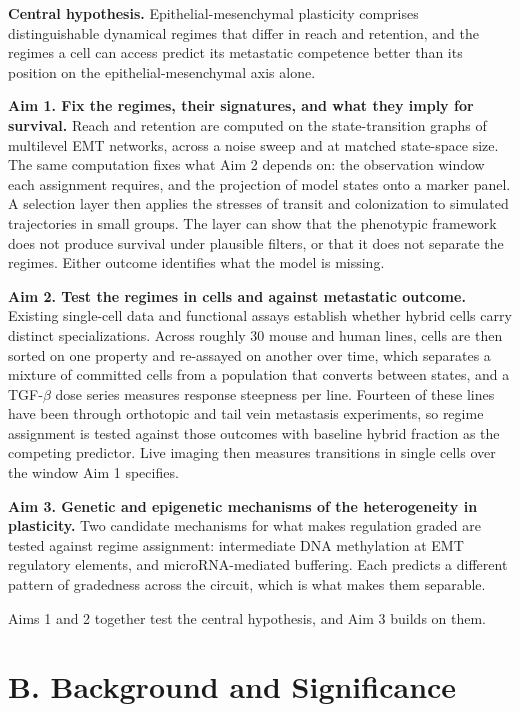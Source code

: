 \documentclass[12pt,letterpaper]{article}
\newcommand{\chg}[1]{\textcolor{chgcolor}{#1}}
\newcommand{\chg}[1]{#1}
\newcommand{\lead}[1]{\textbf{#1}}
\begin{document}
\lead{Central hypothesis.} Epithelial-mesenchymal plasticity comprises distinguishable dynamical regimes that differ in reach and retention, and the regimes a cell can access predict its metastatic competence better than its position on the epithelial-mesenchymal axis alone.

\lead{Aim 1. Fix the regimes, their signatures, and what they imply for survival.} Reach and retention are computed on the state-transition graphs of multilevel EMT networks, across a noise sweep and at matched state-space size. The same computation fixes what Aim 2 depends on: the observation window each assignment requires, and the projection of model states onto a marker panel. A selection layer then applies the stresses of transit and colonization to simulated trajectories in small groups. The layer can show that the phenotypic framework does not produce survival under plausible filters, or that it does not separate the regimes. Either outcome identifies what the model is missing.

\lead{Aim 2. Test the regimes in cells and against metastatic outcome.} Existing single-cell data and functional assays establish whether hybrid cells carry distinct specializations. Across roughly 30 mouse and human lines, cells are then sorted on one property and re-assayed on another over time, which separates a mixture of committed cells from a population that converts between states, and a TGF-$\beta$ dose series measures response steepness per line. Fourteen of these lines have been through orthotopic and tail vein metastasis experiments, so regime assignment is tested against those outcomes with baseline hybrid fraction as the competing predictor. Live imaging then measures transitions in single cells over the window Aim 1 specifies.

\lead{Aim 3. Genetic and epigenetic mechanisms of the heterogeneity in plasticity.} \chg{Two} candidate mechanisms for what makes regulation graded are tested against regime assignment: intermediate DNA methylation at EMT regulatory elements\chg{,} and microRNA-mediated buffering. Each predicts a different pattern of gradedness across the circuit, which is what makes them separable.

Aims 1 and 2 together test the central hypothesis, and Aim 3 builds on them.

\section{B. Background and Significance}
\end{document}
